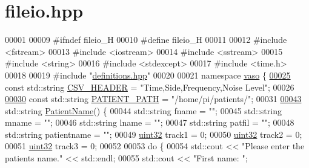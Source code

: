 \hypertarget{fileio_8hpp_source}{\section{fileio.\+hpp}
\label{fileio_8hpp_source}
}

\begin{DoxyCode}
00001 
00009 \textcolor{preprocessor}{#ifndef fileio\_H}
00010 \textcolor{preprocessor}{#define fileio\_H}
00011 
00012 \textcolor{preprocessor}{#include <fstream>}
00013 \textcolor{preprocessor}{#include <iostream>}
00014 \textcolor{preprocessor}{#include <sstream>}
00015 \textcolor{preprocessor}{#include <string>}
00016 \textcolor{preprocessor}{#include <stdexcept>}
00017 \textcolor{preprocessor}{#include <time.h>}
00018 
00019 \textcolor{preprocessor}{#include "\hyperlink{definitions_8hpp}{definitions.hpp}"}
00020 
00021 \textcolor{keyword}{namespace }\hyperlink{namespacevaso}{vaso} \{
\hypertarget{fileio_8hpp_source_l00025}{}\hyperlink{namespacevaso_ade7cbcaad3dc577b643b3eea4b4e8aa0}{00025}     \textcolor{keyword}{const} std::string \hyperlink{namespacevaso_ade7cbcaad3dc577b643b3eea4b4e8aa0}{CSV\_HEADER} = \textcolor{stringliteral}{"Time,Side,Frequency,Noise Level"};
00026 
\hypertarget{fileio_8hpp_source_l00030}{}\hyperlink{namespacevaso_a0f49c8240a13e7d853912ad78d5f53c9}{00030}     \textcolor{keyword}{const} std::string \hyperlink{namespacevaso_a0f49c8240a13e7d853912ad78d5f53c9}{PATIENT\_PATH} = \textcolor{stringliteral}{"/home/pi/patients/"};
00031 
\hypertarget{fileio_8hpp_source_l00043}{}\hyperlink{namespacevaso_a21e264fa912f7ca3f50e7e412ba1582e}{00043}     std::string \hyperlink{namespacevaso_a21e264fa912f7ca3f50e7e412ba1582e}{PatientName}() \{
00044         std::string fname = \textcolor{stringliteral}{""};
00045         std::string mname = \textcolor{stringliteral}{""};
00046         std::string lname = \textcolor{stringliteral}{""};
00047         std::string patfil = \textcolor{stringliteral}{""};
00048         std::string patientname = \textcolor{stringliteral}{""};
00049         \hyperlink{definitions_8hpp_a1134b580f8da4de94ca6b1de4d37975e}{uint32} track1 = 0;
00050         \hyperlink{definitions_8hpp_a1134b580f8da4de94ca6b1de4d37975e}{uint32} track2 = 0;
00051         \hyperlink{definitions_8hpp_a1134b580f8da4de94ca6b1de4d37975e}{uint32} track3 = 0;
00052 
00053         \textcolor{keywordflow}{do} \{
00054             std::cout << \textcolor{stringliteral}{"Please enter the patients name."} << std::endl;
00055             std::cout << \textcolor{stringliteral}{"First name: "};

\end{DoxyCode}
